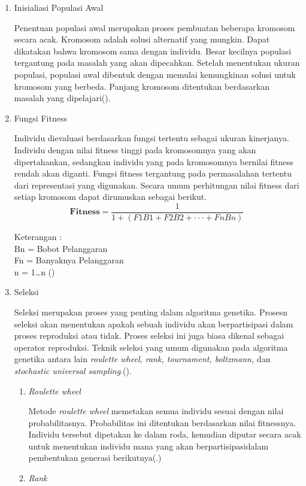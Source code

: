 \begin{enumerate}
\begin{enumerate}
  \end{enumerate}
  
  \item Inisialiasi Populasi Awal
  
  Penentuan populasi awal merupakan proses pembuatan beberapa kromosom secara acak. Kromosom adalah solusi alternatif yang mungkin. Dapat dikatakan bahwa kromosom sama dengan individu. Besar kecilnya populasi tergantung pada masalah yang akan dipecahkan. Setelah menentukan ukuran populasi, populasi awal dibentuk dengan memulai kemungkinan solusi untuk kromosom yang berbeda. Panjang kromosom ditentukan berdasarkan masalah yang dipelajari(\cite{Ardiansyah2022}).
  \item Fungsi Fitness
  
  Individu dievaluasi berdasarkan fungsi tertentu sebagai ukuran kinerjanya. 
  Individu dengan nilai fitness tinggi pada kromosomnya yang akan dipertahankan, 
  sedangkan individu yang pada kromosomnya bernilai fitness rendah akan diganti. 
  Fungsi fitness tergantung pada permasalahan tertentu dari representasi yang digunakan. 
  Secara umum perhitungan nilai fitness dari setiap kromosom dapat dirumuskan sebagai berikut.
  \begin{equation}
    \label{eq:fitness}
    \mathbf{Fitness} = \frac{1}{1 + (F1B1 + F2B2 + \cdot \cdot \cdot +  FnBn)}\; 
  \end{equation}

  Keterangan :\\
  Bn = Bobot Pelanggaran\\
  Fn = Banyaknya Pelanggaran\\
  n  = 1…n (\cite{muhammad2020penjadwalan})
  \item Seleksi
  
  Seleksi merupakan proses yang penting dalam algoritma genetika. 
  Prosesn seleksi akan menentukan apakah sebuah individu akan berpartisipasi dalam proses reproduksi atau tidak.
  Proses seleksi ini juga biasa dikenal sebagai operator reproduksi. 
  Teknik seleksi yang umum digunakan pada algoritma genetika antara lain \emph{roulette wheel, rank, tournament, boltzmann,} dan \emph{stochastic universal sampling}.(\cite{Katoch2020}).
  
  \begin{enumerate}
    \item \emph{Roulette wheel}
    
    Metode \emph{roulette wheel} memetakan semua individu sesuai dengan nilai probabilitasnya. Probabilitas ini ditentukan berdasarkan nilai fitnessnya. Individu tersebut dipetakan ke dalam roda, kemudian diputar secara acak untuk menentukan individu mana yang akan berpartisipasidalam pembentukan generasi berikutnya(\cite{Katoch2020}.)
    \item \emph{Rank}
    

\end{enumerate}
\end{enumerate}
